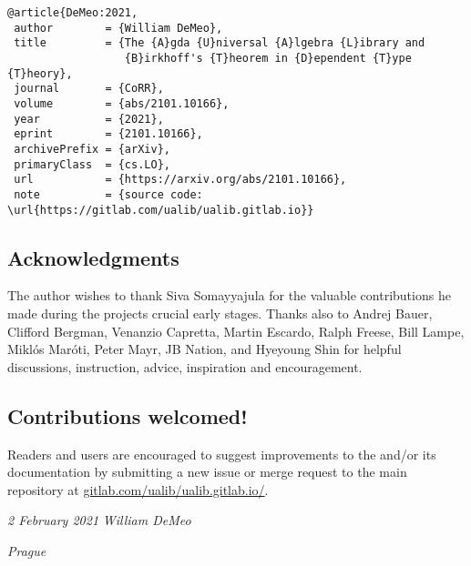 {\small
\begin{verbatim}
@article{DeMeo:2021,
 author        = {William DeMeo},
 title         = {The {A}gda {U}niversal {A}lgebra {L}ibrary and 
                  {B}irkhoff's {T}heorem in {D}ependent {T}ype {T}heory}, 
 journal       = {CoRR},
 volume        = {abs/2101.10166},
 year          = {2021},
 eprint        = {2101.10166},
 archivePrefix = {arXiv},
 primaryClass  = {cs.LO},
 url           = {https://arxiv.org/abs/2101.10166},
 note          = {source code: \url{https://gitlab.com/ualib/ualib.gitlab.io}}
\end{verbatim}
}

\subsection*{Acknowledgments}
The author wishes to thank Siva Somayyajula for the valuable contributions he made during the projects crucial early stages. Thanks also to Andrej Bauer, Clifford Bergman, Venanzio Capretta, Martin Escardo, Ralph Freese, Bill Lampe, Miklós Maróti, Peter Mayr, JB Nation, and Hyeyoung Shin for helpful discussions, instruction, advice, inspiration
and encouragement.

\subsection*{Contributions welcomed!}
Readers and users are encouraged to suggest improvements to the \agdaualib and/or its documentation by submitting a new issue or merge request to the main repository at \href{https://gitlab.com/ualib/ualib.gitlab.io/}{gitlab.com/ualib/ualib.gitlab.io/}.

\bigskip

\bigskip

\noindent \textit{2 February 2021} \hfill \textit{William DeMeo}

\hfill \textit{Prague}


